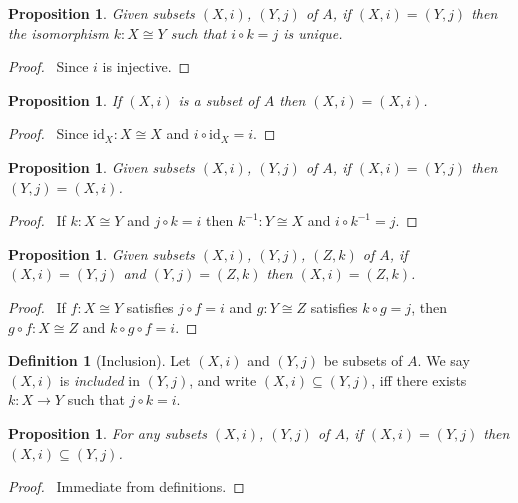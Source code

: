 \documentclass{book}
\let\qed\relax
\newtheorem{prop}[ax]{Proposition}
\theoremstyle{definition}
\newtheorem{df}[ax]{Definition}
\newcommand{\id}[1]{\ensuremath{\mathrm{id}_{#1}}}
\newcommand{\inv}[1]{\ensuremath{{#1}^{-1}}}
\begin{document}
\begin{prop}
Given subsets $(X,i)$, $(Y,j)$ of $A$, if $(X,i) = (Y,j)$ then the isomorphism $k : X \cong Y$ such that $i \circ k = j$ is unique.
\end{prop}

\begin{proof}
\pf\ Since $i$ is injective. \qed
\end{proof}

\begin{prop}
If $(X,i)$ is a subset of $A$ then $(X,i) = (X,i)$.
\end{prop}

\begin{proof}
\pf\ Since $\id{X} : X \cong X$ and $i \circ \id{X} = i$. \qed
\end{proof}

\begin{prop}
Given subsets $(X,i)$, $(Y,j)$ of $A$, if $(X,i) = (Y,j)$ then $(Y,j) = (X,i)$.
\end{prop}

\begin{proof}
\pf\ If $k : X \cong Y$ and $j \circ k = i$ then $\inv{k} : Y \cong X$ and $i \circ \inv{k} = j$. \qed
\end{proof}

\begin{prop}
Given subsets $(X,i)$, $(Y,j)$, $(Z,k)$ of $A$, if $(X,i) = (Y,j)$ and $(Y,j) = (Z,k)$ then $(X,i) = (Z,k)$.
\end{prop}

\begin{proof}
\pf\ If $f : X \cong Y$ satisfies $j \circ f = i$ and $g : Y \cong Z$ satisfies $k \circ g = j$, then $g \circ f : X \cong Z$ and $k \circ g \circ f = i$. \qed
\end{proof}

\begin{df}[Inclusion]
Let $(X,i)$ and $(Y,j)$ be subsets of $A$. We say $(X,i)$ is \emph{included} in $(Y,j)$, and write $(X,i) \subseteq (Y,j)$, iff there exists $k : X \rightarrow Y$ such that $j \circ k = i$.
\end{df}

\begin{prop}
For any subsets $(X,i)$, $(Y,j)$ of $A$, if $(X,i) = (Y,j)$ then $(X,i) \subseteq (Y,j)$.
\end{prop}

\begin{proof}
\pf\ Immediate from definitions. \qed
\end{proof}
\end{document}
